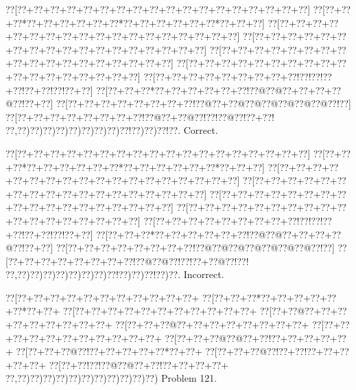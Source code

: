 \documentclass[a5paper]{article}
\begin{document}
\begin{center}
{\goo
\0??[\0??+\0??+\0??+\0??+\0??+\0??+\0??+\0??+\0??+\0??+\0??+\0??+\0??+\0??+\0??+\0??+\0??+\0??]
\0??[\0??+\0??+\0??*\0??+\0??+\0??+\0??+\0??+\0??*\0??+\0??+\0??+\0??+\0??+\0??*\0??+\0??+\0??]
\0??[\0??+\0??+\0??+\0??+\0??+\0??+\0??+\0??+\0??+\0??+\0??+\0??+\0??+\0??+\0??+\0??+\0??+\0??]
\0??[\0??+\0??+\0??+\0??+\0??+\0??+\0??+\0??+\0??+\0??+\0??+\0??+\0??+\0??+\0??+\0??+\0??+\0??]
\0??[\0??+\0??+\0??+\0??+\0??+\0??+\0??+\0??+\0??+\0??+\0??+\0??+\0??+\0??+\0??+\0??+\0??+\0??]
\0??[\0??+\0??+\0??+\0??+\0??+\0??+\0??+\0??+\0??+\0??+\0??+\0??+\0??+\0??+\0??+\0??+\0??+\0??]
\0??[\0??+\0??+\0??+\0??+\0??+\0??+\0??+\0??+\0??!\0??!\0??!\0??+\0??!\0??+\0??!\0??!\0??+\0??]
\0??[\0??+\0??+\0??*\0??+\0??+\0??+\0??+\0??+\0??!\0??@\0??@\0??+\0??+\0??+\0??@\0??!\0??+\0??]
\0??[\0??+\0??+\0??+\0??+\0??+\0??+\0??+\0??!\0??@\0??+\0??@\0??@\0??@\0??@\0??@\0??@\0??!\0??]
\0??[\0??+\0??+\0??+\0??+\0??+\0??+\0??+\0??!\0??@\0??+\0??@\0??!\0??!\0??@\0??!\0??+\0??!
\0??,\0??)\0??)\0??)\0??)\0??)\0??)\0??)\0??)\0??!\0??)\0??)\0??!\0??.
}
Correct. 

\end{center}
\begin{center}
{\goo
\0??[\0??+\0??+\0??+\0??+\0??+\0??+\0??+\0??+\0??+\0??+\0??+\0??+\0??+\0??+\0??+\0??+\0??+\0??]
\0??[\0??+\0??+\0??*\0??+\0??+\0??+\0??+\0??+\0??*\0??+\0??+\0??+\0??+\0??+\0??*\0??+\0??+\0??]
\0??[\0??+\0??+\0??+\0??+\0??+\0??+\0??+\0??+\0??+\0??+\0??+\0??+\0??+\0??+\0??+\0??+\0??+\0??]
\0??[\0??+\0??+\0??+\0??+\0??+\0??+\0??+\0??+\0??+\0??+\0??+\0??+\0??+\0??+\0??+\0??+\0??+\0??]
\0??[\0??+\0??+\0??+\0??+\0??+\0??+\0??+\0??+\0??+\0??+\0??+\0??+\0??+\0??+\0??+\0??+\0??+\0??]
\0??[\0??+\0??+\0??+\0??+\0??+\0??+\0??+\0??+\0??+\0??+\0??+\0??+\0??+\0??+\0??+\0??+\0??+\0??]
\0??[\0??+\0??+\0??+\0??+\0??+\0??+\0??+\0??+\0??!\0??!\0??!\0??+\0??!\0??+\0??!\0??!\0??+\0??]
\0??[\0??+\0??+\0??*\0??+\0??+\0??+\0??+\0??+\0??!\0??@\0??@\0??+\0??+\0??+\0??@\0??!\0??+\0??]
\0??[\0??+\0??+\0??+\0??+\0??+\0??+\0??+\0??!\0??@\0??@\0??@\0??@\0??@\0??@\0??@\0??!\0??]
\0??[\0??+\0??+\0??+\0??+\0??+\0??+\0??+\0??!\0??@\0??@\0??!\0??!\0??+\0??@\0??!\0??!
\0??,\0??)\0??)\0??)\0??)\0??)\0??)\0??)\0??!\0??)\0??)\0??!\0??)\0??.
}
Incorrect. 

\end{center}
\newpage
\begin{center}
{\goo
\0??[\0??+\0??+\0??+\0??+\0??+\0??+\0??+\0??+\0??+\0??+\0??+
\0??[\0??+\0??+\0??*\0??+\0??+\0??+\0??+\0??+\0??*\0??+\0??+
\0??[\0??+\0??+\0??+\0??+\0??+\0??+\0??+\0??+\0??+\0??+\0??+
\0??[\0??+\0??@\0??+\0??+\0??+\0??+\0??+\0??+\0??+\0??+\0??+
\0??[\0??+\0??+\0??@\0??+\0??+\0??+\0??+\0??+\0??+\0??+\0??+
\0??[\0??+\0??+\0??+\0??+\0??+\0??+\0??+\0??+\0??+\0??+\0??+
\0??[\0??+\0??+\0??@\0??@\0??+\0??!\0??+\0??+\0??+\0??+\0??+
\0??[\0??+\0??+\0??@\0??!\0??+\0??+\0??+\0??+\0??*\0??+\0??+
\0??[\0??+\0??+\0??@\0??!\0??+\0??!\0??+\0??+\0??+\0??+\0??+
\0??[\0??+\0??!\0??!\0??@\0??@\0??+\0??!\0??+\0??+\0??+\0??+
\0??,\0??)\0??)\0??)\0??)\0??)\0??)\0??)\0??)\0??)\0??)\0??)
}
Problem 121.

\end{center}
\end{document}
